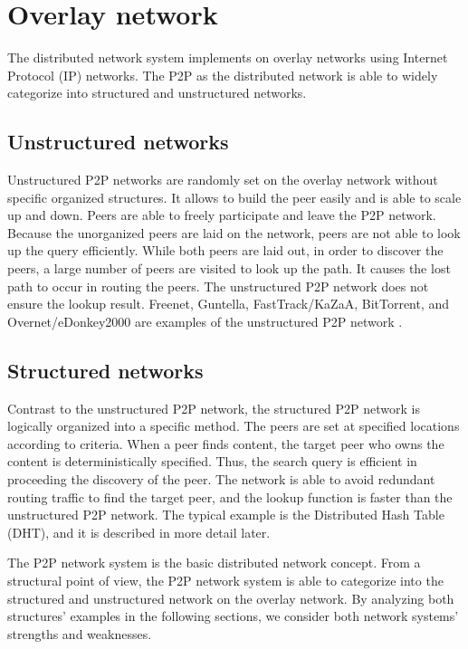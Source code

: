 \section{Overlay network}

The distributed network system implements on overlay networks using Internet Protocol (IP) networks. The P2P as the distributed network is able to widely categorize into structured and unstructured networks.

\subsection{Unstructured networks}

Unstructured P2P networks are randomly set on the overlay network without specific organized structures. It allows to build the peer easily and is able to scale up and down. Peers are able to freely participate and leave the P2P network. Because the unorganized peers are laid on the network, peers are not able to look up the query efficiently. While both peers are laid out, in order to discover the peers, a large number of peers are visited to look up the path. It causes the lost path to occur in routing the peers. The unstructured P2P network does not ensure the lookup result. Freenet, Guntella, FastTrack/KaZaA, BitTorrent, and Overnet/eDonkey2000 are examples of the unstructured P2P network \cite{lua2005survey}.

\subsection{Structured networks}

Contrast to the unstructured P2P network, the structured P2P network is logically organized into a specific method. The peers are set at specified locations according to criteria. When a peer finds content, the target peer who owns the content is deterministically specified. Thus, the search query is efficient in proceeding the discovery of the peer. The network is able to avoid redundant routing traffic to find the target peer, and the lookup function is faster than the unstructured P2P network. The typical example is the Distributed Hash Table (DHT), and it is described in more detail later.

The P2P network system is the basic distributed network concept. From a structural point of view, the P2P network system is able to categorize into the structured and unstructured network on the overlay network. By analyzing both structures' examples in the following sections, we consider both network systems' strengths and weaknesses.

